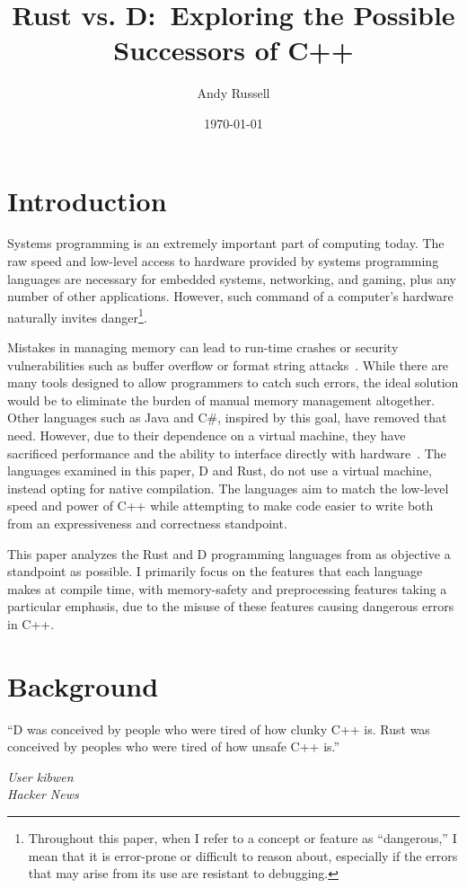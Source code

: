 \documentclass[finalcopy]{srpaper}
\title{Rust vs. D:\ Exploring the Possible Successors of C++}
\author{Andy Russell}
\date{\today}
\begin{document}
\frontmatter

\listoflistings{}

\chapter{Introduction}

Systems programming is an extremely important part of computing today. The raw
speed and low-level access to hardware provided by systems programming
languages are necessary for embedded systems, networking, and gaming, plus any
number of other applications. However, such command of a computer's hardware
naturally invites danger\footnote{Throughout this paper, when I refer to a
concept or feature as ``dangerous,'' I mean that it is error-prone or difficult
to reason about, especially if the errors that may arise from its use are
resistant to debugging.}.

Mistakes in managing memory can lead to run-time crashes or security
vulnerabilities such as buffer overflow or format string
attacks~\cite{Shahriar:2012:MPS:2187671.2187673,Seacord:2013:SCC:2530475}.
While there are many tools designed to allow programmers to catch such errors,
the ideal solution would be to eliminate the burden of manual memory management
altogether. Other languages such as Java and C\#, inspired by this goal, have
removed that need. However, due to their dependence on a virtual machine, they
have sacrificed performance and the ability to interface directly with
hardware~\cite{Alexandrescu:2010:DPL:1875434}. The languages examined in this
paper, D and Rust, do not use a virtual machine, instead opting for native
compilation. The languages aim to match the low-level speed and power of C++
while attempting to make code easier to write both from an expressiveness and
correctness standpoint.

This paper analyzes the Rust and D programming languages from as objective a
standpoint as possible. I primarily focus on the features that each language
makes at compile time, with memory-safety and preprocessing features taking a
particular emphasis, due to the misuse of these features causing dangerous
errors in C++.

\chapter{Background}\label{chap:background}

\epigraph{``D was conceived by people who were tired of how clunky C++ is. Rust
was conceived by peoples who were tired of how unsafe C++ is.''}{
\textit{User kibwen \\ Hacker News}}
\end{document}
